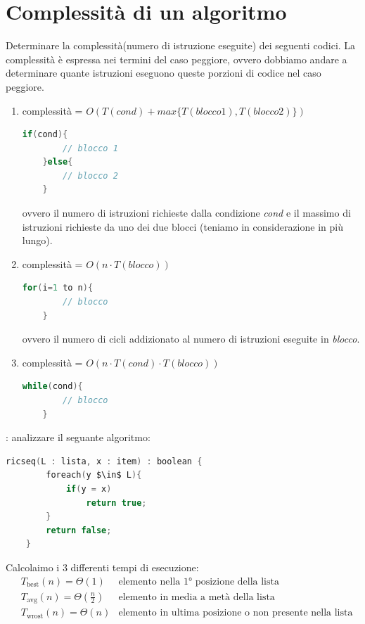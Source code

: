 \documentclass[italian]{article}
\newcommand{\exercize}{\text{\faPencil $\;$ Esercizio }}
\begin{document}
\section{Complessità di un algoritmo}
Determinare la complessità(numero di istruzione eseguite) dei seguenti codici. La complessità è espressa nei termini del caso peggiore, ovvero dobbiamo andare a determinare quante istruzioni eseguono queste porzioni di codice nel caso peggiore.
\begin{enumerate}[label=\alph*)]
	\item complessità = $O(T(cond)+max\{ T(blocco1), T(blocco2) \})$
	\begin{lstlisting}[language=c]
	if(cond){
		// blocco 1
	}else{
		// blocco 2
	}
	\end{lstlisting}
	ovvero il numero di istruzioni richieste dalla condizione \textit{cond} e il massimo di istruzioni richieste da uno dei due blocci (teniamo in considerazione in più lungo).
	
	\item complessità = $O(n\cdot T(blocco))$
	\begin{lstlisting}[language=c]
	for(i=1 to n){
		// blocco
	}
	\end{lstlisting}
	ovvero il numero di cicli addizionato al numero di istruzioni eseguite in \textit{blocco}.
	
	\item complessità = $O(n\cdot T(cond) \cdot T(blocco))$
	\begin{lstlisting}[language=c]
	while(cond){
		// blocco
	}
	\end{lstlisting}	
\end{enumerate}
\exercize: analizzare il seguante algoritmo:
\begin{lstlisting}[language=c,mathescape=true]
	ricseq(L : lista, x : item) : boolean {
		foreach(y $\in$ L){
			if(y = x)
				return true;
		}
		return false;
	}
\end{lstlisting}
Calcolaimo i 3 differenti tempi di esecuzione:
\begin{align*}
	&T_{\text{best}}(n) = \varTheta(1) & \text{elemento nella 1° posizione della lista} \\
	&T_{\text{avg}}(n) = \varTheta(\frac{n}{2}) & \text{elemento in media a metà della lista} \\
	&T_{\text{wrost}}(n) = \varTheta(n) & \text{elemento in ultima posizione o non presente nella lista}
\end{align*}
\pagebreak
\end{document}
